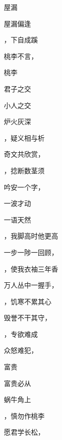 \documentclass[12pt, a4paper, addpoints, answers]{exam}
\begin{document}
\begin{multicols}{2}
\begin{questions}
\question[2] 

\question[2] 屋漏

\question[2] 屋漏偏逢\fillin

\question[2] \fillin，下自成蹊

\question[2] 桃李不言，\fillin

\question[2] 

\question[2] 桃李\fillin

\question[2] 

\question[2] 君子之交\fillin

\question[2] 

\question[2] 小人之交\fillin

\question[2] 

\question[2] 炉火灰深\fillin

\question[2] \fillin，疑义相与析

\question[2] 奇文共欣赏，\fillin

\question[2] \fillin，捻断数茎须

\question[2] 吟安一个字，\fillin

\question[2] 

\question[2] 一波才动\fillin

\question[2] 

\question[2] 一语天然\fillin

\question[2] \fillin，我脚高时他更高

\question[2] 一步一陟一回顾，\fillin

\question[2] \fillin，使我衣袖三年香

\question[2] 万人丛中一握手，\fillin

\question[2] \fillin，饥寒不累其心

\question[2] 毁誉不干其守，\fillin

\question[2] \fillin，专欲难成

\question[2] 众怒难犯，\fillin

\question[2] 

\question[2] 富贵

\question[2] 富贵必从\fillin

\question[2] 

\question[2] 蜗牛角上\fillin

\question[2] \fillin，慎勿作桃李

\question[2] 愿君学长松，\fillin

\question[2] 


\end{questions}
\end{multicols}
\end{document}
